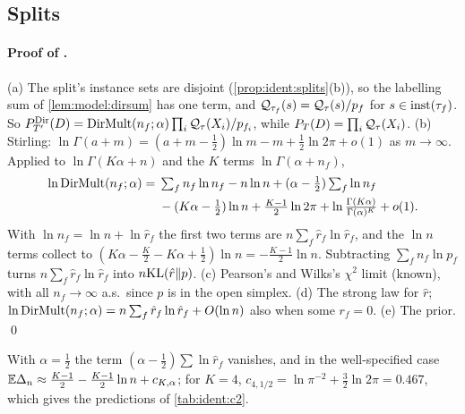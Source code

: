 \subsection{Splits}\label{app:ident:mdl}

\paragraph{Proof of .} (a) The split's instance sets are disjoint (\cref{prop:ident:splits}(b)), so the labelling sum of \cref{lem:model:dirsum} has one term, and $\mathcal{Q}_{\tau_f}(s)=\mathcal{Q}_\tau(s)/p_f$ for $s\in\mathrm{inst}(\tau_f)$. So $P^{\mathrm{Dir}}_{T'}(D)=\mathrm{DirMult}(n_f;\alpha)\prod_i\mathcal{Q}_\tau(X_i)/p_{f_i}$, while $P_T(D)=\prod_i\mathcal{Q}_\tau(X_i)$.
(b) Stirling: $\ln\Gamma(a+m)=(a+m-\frac12)\ln m-m+\frac12\ln2\pi+o(1)$ as $m\to\infty$. Applied to $\ln\Gamma(K\alpha+n)$ and the $K$ terms $\ln\Gamma(\alpha+n_f)$,
\begin{align*}\ln\mathrm{DirMult}(n_f;\alpha)={}&\textstyle\sum_fn_f\ln n_f-n\ln n+(\alpha-\frac12)\sum_f\ln n_f\\&\textstyle{}-(K\alpha-\frac12)\ln n+\frac{K-1}2\ln2\pi+\ln\frac{\Gamma(K\alpha)}{\Gamma(\alpha)^K}+o(1).\end{align*}
With $\ln n_f=\ln n+\ln\hat r_f$ the first two terms are $n\sum_f\hat r_f\ln\hat r_f$, and the $\ln n$ terms collect to $(K\alpha-\frac K2-K\alpha+\frac12)\ln n=-\frac{K-1}2\ln n$. Subtracting $\sum_fn_f\ln p_f$ turns $n\sum_f\hat r_f\ln\hat r_f$ into $n\mathrm{KL}(\hat r\|p)$.
(c) Pearson's and Wilks's $\chi^2$ limit (known), with all $n_f\to\infty$ a.s.\ since $p$ is in the open simplex. (d) The strong law for $\hat r$; $\ln\mathrm{DirMult}(n_f;\alpha)=n\sum_f\hat r_f\ln\hat r_f+O(\ln n)$ also when some $r_f=0$. (e) The prior. \qed

With $\alpha=\frac12$ the term $(\alpha-\frac12)\sum\ln\hat r_f$ vanishes, and in the well-specified case $\mathbb{E}\Delta_n\approx\frac{K-1}2-\frac{K-1}2\ln n+c_{K,\alpha}$; for $K=4$, $c_{4,1/2}=\ln\pi^{-2}+\frac32\ln2\pi=0.467$, which gives the predictions of \cref{tab:ident:c2}.

